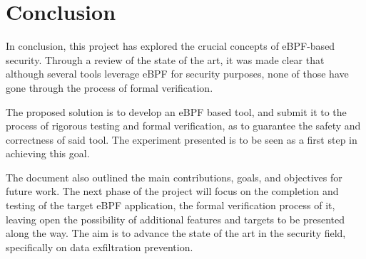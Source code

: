 \chapter{Conclusion}

In conclusion, this project has explored the crucial concepts of eBPF-based security. Through a review of the state of the art, it was made clear that although several tools leverage eBPF for security purposes, none of those have gone through the process of formal verification. 

The proposed solution is to develop an eBPF based tool, and submit it to the process of rigorous testing and formal verification, as to guarantee the safety and correctness of said tool. The experiment presented is to be seen as a first step in achieving this goal. 

The document also outlined the main contributions, goals, and objectives for future work. 
The next phase of the project will focus on the completion and testing of the target eBPF application, the formal verification process of it, leaving open the possibility of additional features and targets to be presented along the way. The aim is to advance the state of the art in the security field, specifically on data exfiltration prevention.
